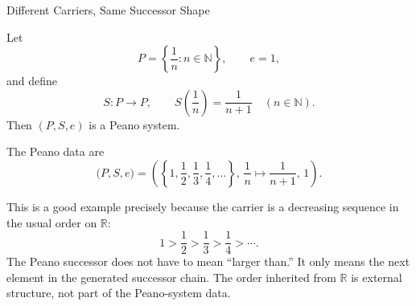 \begin{topicbox}{Different Carriers, Same Successor Shape}
\begin{example*}
Let
\[
P=\left\{\frac{1}{n}:n\in\mathbb{N}\right\}, \qquad e=1,
\]
and define
\[
S:P\to P,
\qquad
S\!\left(\frac{1}{n}\right)=\frac{1}{n+1}
\quad(n\in\mathbb{N}).
\]
Then $(P,S,e)$ is a Peano system.
\end{example*}

\begin{remark*}[Structure]
The Peano data are
\[
\bigl(P,S,e\bigr)
=
\left(
\left\{1,\frac{1}{2},\frac{1}{3},\frac{1}{4},\ldots\right\},
\,\frac{1}{n}\mapsto \frac{1}{n+1},
\,1
\right).
\]
\end{remark*}

\begin{remark*}[Interpretation]
This is a good example precisely because the carrier is a decreasing sequence
in the usual order on $\mathbb{R}$:
\[
1>\frac{1}{2}>\frac{1}{3}>\frac{1}{4}>\cdots.
\]
The Peano successor does not have to mean ``larger than.'' It only means the
next element in the generated successor chain. The order inherited from
$\mathbb{R}$ is external structure, not part of the Peano-system data.
\end{remark*}
\end{topicbox}

